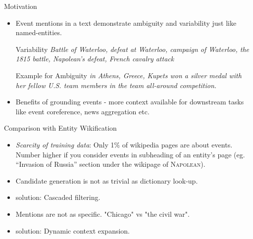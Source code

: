 \begin{frame}{Motivation}
\begin{itemize}
\item Event mentions in a text demonstrate ambiguity and variability just like named-entities.
\begin{exampleblock}{Variability}
\emph{Battle of Waterloo, defeat at Waterloo, campaign of Waterloo, the 1815 battle, Napolean's defeat, French cavalry attack}
\end{exampleblock}
\begin{exampleblock}{Example for Ambiguity}
\emph{ in Athens, Greece, Kupets won a silver medal with her fellow U.S. team members in the team all-around competition.}
\end{exampleblock}
\item Benefits of grounding events - more context available for downstream tasks like event coreference, news aggregation etc.
\end{itemize}
\end{frame}


\begin{frame}{Comparison with Entity Wikification}

\begin{itemize}
\item \emph{Scarcity of training data}: Only 1\% of wikipedia pages are about events. Number higher if you consider events in subheading of an entity's page (eg. ``Invasion of Russia'' section under the wikipage of \textsc{Napolean}).
\pause
\item Candidate generation is not as trivial as dictionary look-up.
\pause
\item {\color{red}solution:} Cascaded filtering.
\pause
\item Mentions are not as specific. "Chicago" vs "the civil war".
\pause
\item {\color{red}solution:} Dynamic context expansion.
\end{itemize}
\end{frame}

